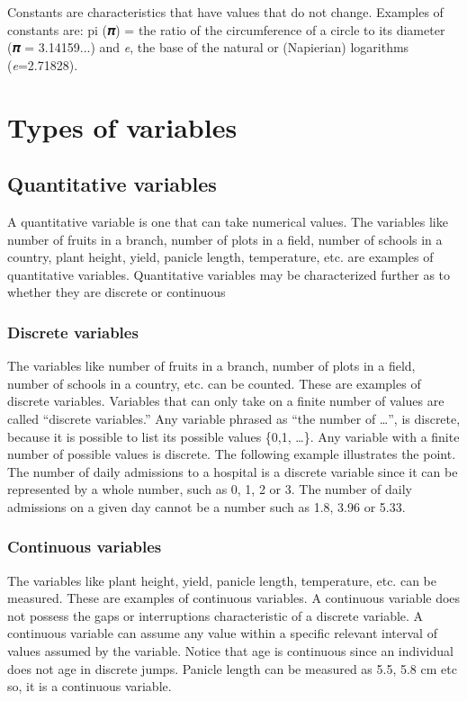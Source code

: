 \documentclass[
]{book}
\begin{document}
Constants are characteristics that have values that do not change.
Examples of constants are: pi (𝝅) = the ratio of the circumference of a
circle to its diameter (𝝅 = 3.14159...) and \emph{e}, the base of the
natural or (Napierian) logarithms (\emph{e}=2.71828).

\section{Types of variables}\label{types-of-variables}

\subsection{Quantitative variables}\label{quantitative-variables}

A quantitative variable is one that can take numerical values. The
variables like number of fruits in a branch, number of plots in a field,
number of schools in a country, plant height, yield, panicle length,
temperature, etc. are examples of quantitative variables. Quantitative
variables may be characterized further as to whether they are discrete
or continuous

\subsubsection{Discrete variables}\label{discrete-variables}

The variables like number of fruits in a branch, number of plots in a
field, number of schools in a country, etc. can be counted. These are
examples of discrete variables. Variables that can only take on a finite
number of values are called ``discrete variables.'' Any variable phrased
as ``the number of \ldots{}'', is discrete, because it is possible to list its
possible values \{0,1, \ldots\}. Any variable with a finite number of
possible values is discrete. The following example illustrates the
point. The number of daily admissions to a hospital is a discrete
variable since it can be represented by a whole number, such as 0, 1, 2
or 3. The number of daily admissions on a given day cannot be a number
such as 1.8, 3.96 or 5.33.

\subsubsection{Continuous variables}\label{continuous-variables}

The variables like plant height, yield, panicle length, temperature,
etc. can be measured. These are examples of continuous variables. A
continuous variable does not possess the gaps or interruptions
characteristic of a discrete variable. A continuous variable can assume
any value within a specific relevant interval of values assumed by the
variable. Notice that age is continuous since an individual does not age
in discrete jumps. Panicle length can be measured as 5.5, 5.8 cm etc so,
it is a continuous variable.
\end{document}
